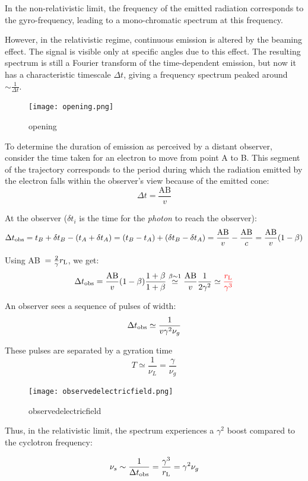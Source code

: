 In the non-relativistic limit, the frequency of the emitted radiation corresponds to the gyro-frequency, leading to a mono-chromatic spectrum at this frequency.

However, in the relativistic regime, continuous emission is altered by the beaming effect. The signal is visible only at specific angles due to this effect. The resulting spectrum is still a Fourier transform of the time-dependent emission, but now it has a characteristic timescale \(  \Delta t \), giving a frequency spectrum peaked around \( \sim \frac{1}{\Delta t} \).

\begin{figure}[t]
\centering
\texttt{[image: opening.png]}
\caption{opening}
\end{figure}

To determine the duration of emission as perceived by a distant observer, consider the time taken for an electron to move from point A to B. This segment of the trajectory corresponds to the period during which the radiation emitted by the electron falls within the observer's view because of the emitted cone:
%
\[
\Delta t = \frac{\text{AB}}{v}
\]

At the observer ($\delta t_i$ is the time for the \emph{photon} to reach the observer): 
%
\[
\Delta t_{\rm obs} = t_B + \delta t_B - (t_A  + \delta t_A) = (t_B - t_A) + (\delta t_B - \delta t_A) = \frac{\text{AB}}{v} - \frac{\text{AB}}{c} = \frac{\text{AB}}{v} (1-\beta)
\]

Using AB~$= \frac{2}{\gamma}r_{\rm L}$, we get:
%
\[
\Delta t_{\rm obs} = \frac{\text{AB}}{v} (1-\beta) \frac{1+\beta}{1+\beta} \overset{\beta \sim 1}{\simeq} \frac{\text{AB}}{v} \frac{1}{2\gamma^2} \simeq {\color{red}\frac{r_{\rm L}}{\gamma^3}}
\]

An observer sees a sequence of pulses of width:
%
\[
\Delta t_{\rm obs} \simeq \frac{1}{v \gamma^2 \nu_g} %
\]

These pulses are separated by a gyration time 
%
\[
T \simeq \frac{1}{\nu_L} = \frac{\gamma}{\nu_g}
\]

\begin{figure}[t]
\centering
\texttt{[image: observedelectricfield.png]}
\caption{observedelectricfield}
\end{figure}

Thus, in the relativistic limit, the spectrum experiences a \( \gamma^2 \) boost compared to the cyclotron frequency:
%
\begin{remark}
\[
\nu_s \sim \frac{1}{\Delta t_{\rm obs}} = \frac{\gamma^3}{r_{\rm L}} = \gamma^2 \nu_g
\]
\end{remark}

